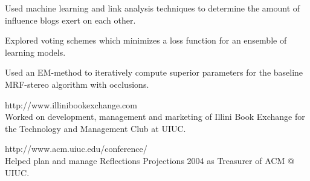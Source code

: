 \begin{resume}
\begin{position}
Used machine learning and link analysis techniques to determine the amount of influence blogs exert on each other.
\end{position}

\begin{position}
Explored voting schemes which minimizes a loss function for an ensemble of learning models. 
\end{position}

\begin{position}
Used an EM-method to iteratively compute superior parameters for the baseline MRF-stereo algorithm with occlusions.
\end{position}

\begin{position}
http://www.illinibookexchange.com\\
Worked on development, management and marketing of Illini Book Exchange for the Technology and Management Club at UIUC. 
\end{position}

\begin{position}
http://www.acm.uiuc.edu/conference/\\
Helped plan and manage Reflections Projections 2004 as Treasurer of ACM @ UIUC.
\end{position}









\end{resume}
